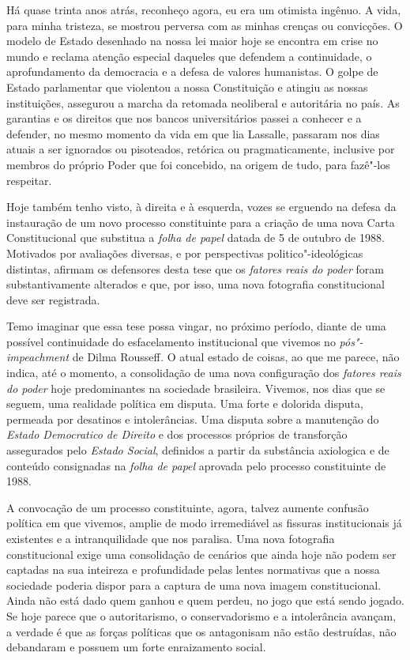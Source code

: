 Há quase trinta anos atrás, reconheço agora, eu era um otimista ingênuo.
A vida, para minha tristeza, se mostrou perversa com as minhas crenças
ou convicções. O modelo de Estado desenhado na nossa lei maior hoje se
encontra em crise no mundo e reclama atenção especial daqueles que
defendem a continuidade, o aprofundamento da democracia e a defesa de
valores humanistas. O golpe de Estado parlamentar que violentou a nossa
Constituição e atingiu as nossas instituições, assegurou a marcha da
retomada neoliberal e autoritária no país. As garantias e os direitos
que nos bancos universitários passei a conhecer e a defender, no mesmo
momento da vida em que lia Lassalle, passaram nos dias atuais a ser
ignorados ou pisoteados, retórica ou pragmaticamente, inclusive por
membros do próprio Poder que foi concebido, na origem de tudo, para
fazê"-los respeitar.

Hoje também tenho visto, à direita e à esquerda, vozes se erguendo na
defesa da instauração de um novo processo constituinte para a criação de
uma nova Carta Constitucional que substitua a \emph{folha de papel}
datada de 5 de outubro de 1988. Motivados por avaliações diversas, e por
perspectivas politico"-ideológicas distintas, afirmam os defensores desta
tese que os \emph{fatores reais do poder} foram substantivamente
alterados e que, por isso, uma nova fotografia constitucional deve ser
registrada.

Temo imaginar que essa tese possa vingar, no próximo período, diante de
uma possível continuidade do esfacelamento institucional que vivemos no
\emph{pós"-impeachment} de Dilma Rousseff\emph{.} O atual estado de
coisas, ao que me parece, não indica, até o momento, a consolidação de
uma nova configuração dos \emph{fatores reais do poder} hoje
predominantes na sociedade brasileira. Vivemos, nos dias que se seguem,
uma realidade política em disputa. Uma forte e dolorida disputa,
permeada por desatinos e intolerâncias. Uma disputa sobre a manutenção
do \emph{Estado Democratico de Direito} e dos processos próprios de
transforção assegurados pelo \emph{Estado Social}, definidos a partir da
substância axiologica e de conteúdo consignadas na \emph{folha de papel}
aprovada pelo processo constituinte de 1988.

A convocação de um processo constituinte, agora, talvez aumente confusão
política em que vivemos, amplie de modo irremediável as fissuras
institucionais já existentes e a intranquilidade que nos paralisa. Uma
nova fotografia constitucional exige uma consolidação de cenários que
ainda hoje não podem ser captadas na sua inteireza e profundidade pelas
lentes normativas que a nossa sociedade poderia dispor para a captura de
uma nova imagem constitucional. Ainda não está dado quem ganhou e quem
perdeu, no jogo que está sendo jogado. Se hoje parece que o
autoritarismo, o conservadorismo e a intolerância avançam, a verdade é
que as forças políticas que os antagonisam não estão destruídas, não
debandaram e possuem um forte enraizamento social.

